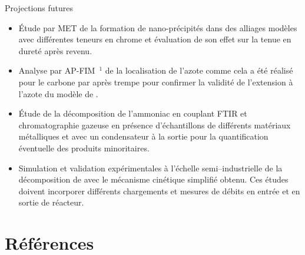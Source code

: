 \documentclass[aspectratio=169,pdf,t]{beamer}
\begin{document}
\begin{frame}{\insertsection}{Projections futures}

  \begin{itemize}
		\item Étude par MET de la formation de nano-précipités dans des alliages modèles  avec différentes teneurs en chrome et évaluation de son effet sur la tenue en dureté après revenu.
		\vfill{}
		
		\item Analyse par AP-FIM~$^\text{1}$ de la localisation de l'azote \textendash{} comme cela a été réalisé pour le carbone par \citet{Hutchinson20115845} \textendash{} après trempe pour confirmer la validité de l'extension à l'azote du modèle de \citet{Norstrom1976}.
		\vfill{}
		
		\item Étude de la décomposition de l'ammoniac en couplant FTIR et chromatographie gazeuse en présence d'échantillons de différents matériaux métalliques et avec un condensateur à la sortie pour la quantification éventuelle des produits minoritaires.
		\vfill{}
		
		\item Simulation et validation expérimentales à l'échelle semi--industrielle de la décomposition de  avec le mécanisme cinétique simplifié obtenu. Ces études doivent incorporer différents chargements et mesures de débits en entrée et en sortie de réacteur.
  \end{itemize}
\end{frame}


\begin{frame}
  \vspace{2cm}\Huge{}
\end{frame}


\section{Références}


\begin{frame}[allowframebreaks]{\insertsection}
  \tiny{}
\end{frame}
\end{document}
